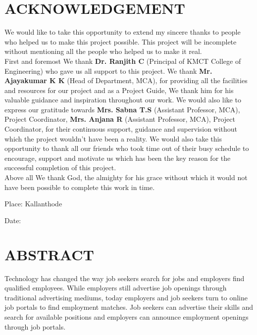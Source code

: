 \documentclass[a4paper,12pt]{report}
\begin{document}
\section*{\centering \bf \large ACKNOWLEDGEMENT}

\vspace*{20pt}

We would like to take this opportunity to extend my sincere thanks to people who helped us to make
this project possible. This project will be incomplete without mentioning all the people who helped
us to make it real.\\

\hspace{12pt} First and foremost We thank { \bf Dr. Ranjith C } (Principal of KMCT College of Engineering) who
gave us all support to this project. We thank { \bf Mr. Ajayakumar K K} (Head of Department, MCA), for providing all the facilities and resources for our project and as a Project Guide, We thank him for his valuable guidance and inspiration throughout our work. We would also like to express our
gratitude towards { \bf Mrs. Sabna T.S }(Assistant Professor, MCA), Project Coordinator, { \bf Mrs. Anjana R }(Assistant Professor, MCA), Project Coordinator, for their
continuous support, guidance and supervision without which the project wouldn’t have been a reality. We would also take this
opportunity to thank all our friends who took time out of their busy schedule to encourage, support
and motivate us which has been the key reason for the successful completion of this project.\\ 
 
Above all We thank God, the almighty for his grace without which it would not have been
possible to complete this work in time.	

\begin{center}\vspace*{40pt}
	Place: Kallanthode  \hspace*{335pt}
\end{center}

\begin{center}\vspace*{10pt}
	Date:   \hspace*{400pt}
\end{center}

\pagebreak


\section*{\centering \bf \large ABSTRACT}
\vspace*{20pt}
\par
\hspace*{12pt}Technology has changed the way job seekers search for jobs and employers
find qualified employees. While employers still advertise job openings through
traditional advertising mediums, today employers and job seekers turn to online
job portals to find employment matches. Job seekers can advertise their skills and
search for available positions and employers can announce employment openings
through job portals.\\
\end{document}
